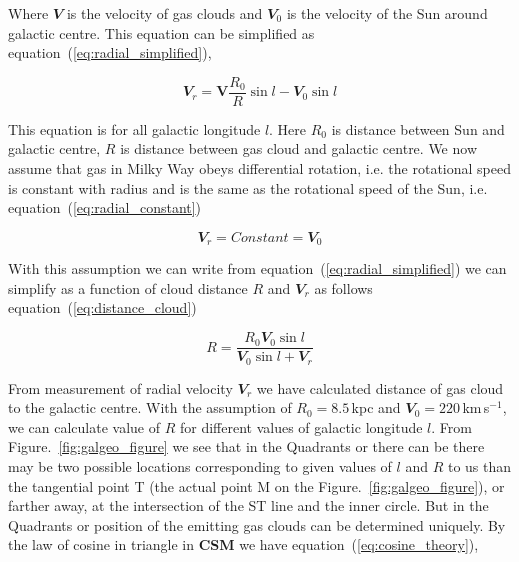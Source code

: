 \documentclass[fleqn,usenatbib]{mnras}
\begin{document}
Where $\mathbfit{V}$ is the velocity of gas clouds and $\mathbfit{V}_{0}$ is the velocity of the Sun around galactic centre. This equation can be simplified as equation~(\ref{eq:radial_simplified}),

\begin{equation}
 \mathbfit{V}_{r}=\mathbf{V}\frac{\mathit{R}_{0}}{\mathit{R}}\sin l-\mathbfit{V}_{0}\sin l
 \label{eq:radial_simplified}
\end{equation} 

This equation is for all galactic longitude $\mathit{l}$. Here $\mathit{R}_{0}$ is distance between Sun and galactic centre, $\mathit{R}$ is distance between  gas cloud and galactic centre. We now assume that gas in Milky Way obeys differential rotation, i.e. the rotational speed is constant with radius and is the same as the rotational speed of the Sun, i.e. equation~(\ref{eq:radial_constant})

\begin{equation}
 \mathbfit{V}_{r}=Constant=\mathbfit{V}_{0}
 \label{eq:radial_constant}
\end{equation}

With this assumption we can write from equation~(\ref{eq:radial_simplified}) we can simplify as a function of cloud distance $\mathit{R}$ and $\mathbfit{V}_{r}$  as follows equation~(\ref{eq:distance_cloud})

\begin{equation}
 \mathit{R}=\frac{\mathit{R}_{0}\mathbfit{V}_{0}\sin l}{\mathbfit{V}_{0}\sin l+\mathbfit{V}_{r}}
 \label{eq:distance_cloud}
\end{equation}

From measurement of radial velocity $\mathbfit{V}_{r}$ we have calculated distance of gas cloud to the galactic centre. With the assumption of $\mathit{R}_{0}=8.5$\,kpc and $\mathbfit{V}_{0}=220$\,km\,s$^{-1}$, we can calculate value of $\mathit{R}$ for different values of galactic longitude $\mathit{l}$. From Figure.~\ref{fig:galgeo_figure} we see that in the Quadrants  or  there can be there may be two possible locations corresponding to given values of $\mathit{l}$ and $\mathit{R}$ to us than the tangential point T (the actual point M on the Figure.~\ref{fig:galgeo_figure}), or farther away, at the intersection of the ST line and the inner circle. But in the Quadrants  or  position of the emitting gas clouds can be determined uniquely\citep{CathyHorellou2015}. By the law of cosine in triangle in \textbf{CSM} we have equation~(\ref{eq:cosine_theory}),
\end{document}
